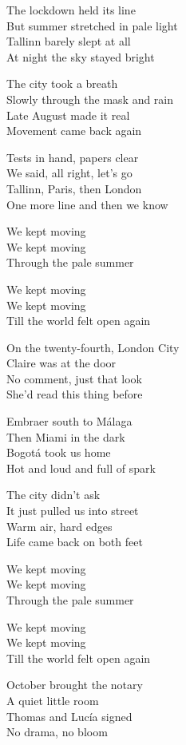 \begin{lyrics}
The lockdown held its line\\
But summer stretched in pale light\\
Tallinn barely slept at all\\
At night the sky stayed bright

The city took a breath\\
Slowly through the mask and rain\\
Late August made it real\\
Movement came back again

Tests in hand, papers clear\\
We said, all right, let's go\\
Tallinn, Paris, then London\\
One more line and then we know

We kept moving\\
We kept moving\\
Through the pale summer

We kept moving\\
We kept moving\\
Till the world felt open again

On the twenty-fourth, London City\\
Claire was at the door\\
No comment, just that look\\
She'd read this thing before

Embraer south to Málaga\\
Then Miami in the dark\\
Bogotá took us home\\
Hot and loud and full of spark

The city didn't ask\\
It just pulled us into street\\
Warm air, hard edges\\
Life came back on both feet

We kept moving\\
We kept moving\\
Through the pale summer

We kept moving\\
We kept moving\\
Till the world felt open again

October brought the notary\\
A quiet little room\\
Thomas and Lucía signed\\
No drama, no bloom


\end{lyrics}
